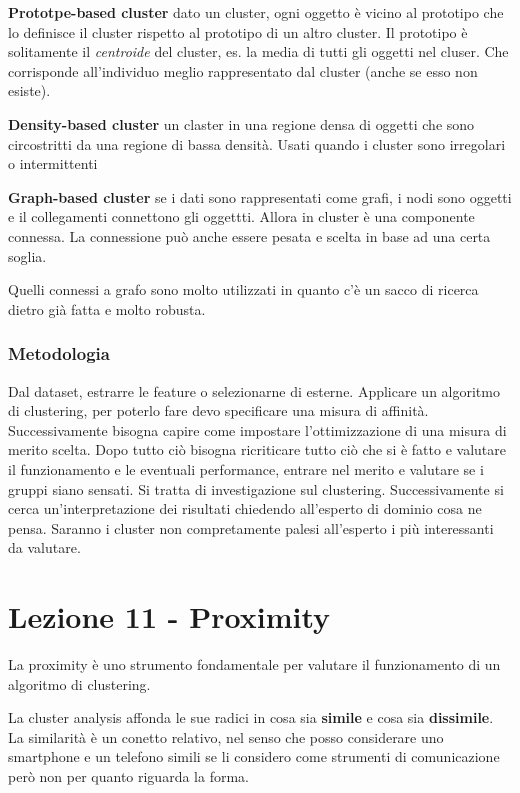 \textbf{Prototpe-based cluster} dato un cluster, ogni oggetto \`e vicino al prototipo che lo definisce il cluster rispetto al prototipo di un altro cluster. Il prototipo \`e solitamente il \textit{centroide} del cluster, es. la media di tutti gli oggetti nel cluser. Che corrisponde all'individuo meglio rappresentato dal cluster (anche se esso non esiste). 

\textbf{Density-based cluster} un claster in una regione densa di oggetti che sono circostritti da una regione di bassa densit\`a. Usati quando i cluster sono irregolari o intermittenti

\textbf{Graph-based cluster} se i dati sono rappresentati come grafi, i nodi sono oggetti e il collegamenti connettono gli oggettti. Allora in cluster \`e una componente connessa. La connessione pu\`o anche essere pesata e scelta in base ad una certa soglia. 

Quelli connessi a grafo sono molto utilizzati in quanto c'\`e un sacco di ricerca dietro gi\`a fatta e molto robusta. 

\subsubsection{Metodologia}
Dal dataset, estrarre le feature o selezionarne di esterne. Applicare un algoritmo di clustering, per poterlo fare devo specificare una misura di affinit\`a. Successivamente bisogna capire come impostare l'ottimizzazione di una misura di merito scelta. Dopo tutto ci\`o bisogna ricriticare tutto ci\`o che si \`e fatto e valutare il funzionamento e le eventuali performance, entrare nel merito e valutare se i gruppi siano sensati. Si tratta di investigazione sul clustering. Successivamente si cerca un'interpretazione dei risultati chiedendo all'esperto di dominio cosa ne pensa. Saranno i cluster non compretamente palesi all'esperto i pi\`u interessanti da valutare. 

\section{Lezione 11 - Proximity}

La proximity \`e uno strumento fondamentale per valutare il funzionamento di un algoritmo di clustering. 

La cluster analysis affonda le sue radici in cosa sia \textbf{simile} e cosa sia \textbf{dissimile}. La similarit\`a \`e un conetto relativo, nel senso che posso considerare uno smartphone e un telefono simili se li considero come strumenti di comunicazione per\`o non per quanto riguarda la forma.

